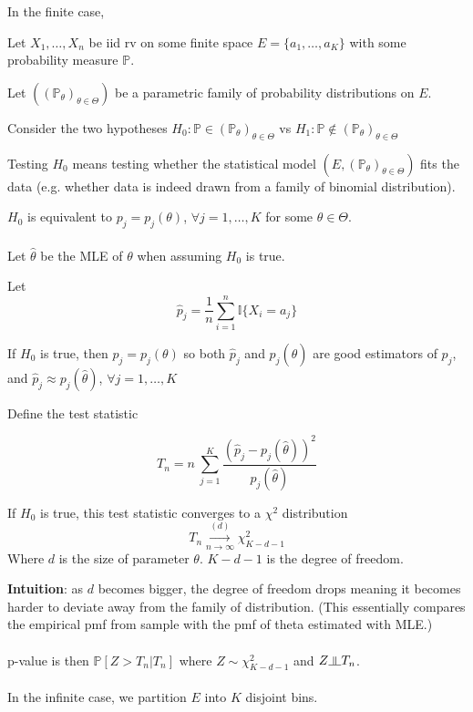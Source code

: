\documentclass{article}
\newcommand{\indep}{\rotatebox[origin=c]{90}{$\models$}}
\begin{document}
In the finite case,

Let $X_1, \dots, X_n$ be iid rv on some finite space $E = \{a_1, \dots, a_K\}$ with some probability measure $\mathbb{P}$.

Let $(\mathbb{(P_{\theta})}_{\theta \in \Theta})$ be a parametric family of probability distributions on $E$.

Consider the two hypotheses $H_0: \mathbb{P} \in (\mathbb{P}_{\theta})_{\theta \in \Theta}$ vs $H_1: \mathbb{P} \notin (\mathbb{P}_{\theta})_{\theta \in \Theta}$

Testing $H_0$ means testing whether the statistical model $(E, (\mathbb{P_{\theta}})_{\theta \in \Theta})$ fits the data (e.g. whether data is indeed drawn from a family of binomial distribution).

$H_0$ is equivalent to $p_j = p_j(\theta)$, $\forall j = 1, \dots, K$ for some $\theta \in \Theta$.
\\
\\
Let $\hat{\theta}$ be the MLE of $\theta$ when assuming $H_0$ is true.

Let
$$
\hat{p}_j = \frac{1}{n} \sum_{i = 1}^{n}\mathbb{I}\{X_i = a_j\}
$$

If $H_0$ is true, then $p_j = p_j(\theta)$ so both $\hat{p}_j$ and $p_j(\hat{\theta})$ are good estimators of $p_j$,
and $\hat{p}_j \approx p_j(\hat{\theta})$, $\forall j = 1, \dots, K$

Define the test statistic

$$
T_n = n ~ \sum_{j = 1}^{K} \frac{(\hat{p}_j - p_j(\hat{\theta}))^2}{p_j(\hat{\theta})}
$$

If $H_0$ is true, this test statistic converges to a $\chi^2$ distribution
$$
T_n \overset{(d)}{\underset{n \to \infty}{\longrightarrow}} \chi^2_{K - d - 1}
$$
Where $d$ is the size of parameter $\theta$. $K - d - 1$ is the degree of freedom.

\textbf{Intuition}: as $d$ becomes bigger, the degree of freedom drops meaning it becomes harder to deviate away from the family of distribution.
(This essentially compares the empirical pmf from sample with the pmf of theta estimated with MLE.)
\\
\\
p-value is then $\mathbb{P}[Z > T_n | T_n]$ where $Z \sim \chi^2_{K - d - 1}$ and $Z \indep T_n$.
\\
\\

In the infinite case, we partition $E$ into $K$ disjoint bins.
\end{document}
